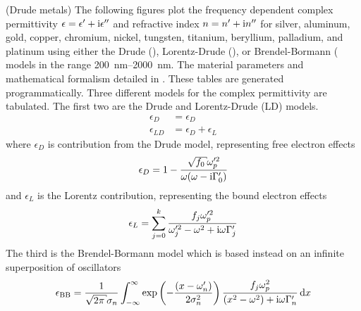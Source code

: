 
(Drude metals) The following figures plot the frequency dependent complex permittivity
$\epsilon = \epsilon' + {\mathrm{i}} \epsilon''$ and refractive index $n = n' + {\mathrm{i}}
n''$ for silver, aluminum, gold, copper, chromium, nickel, tungsten,
titanium, beryllium, palladium, and platinum using either the Drude
(),
Lorentz-Drude (), or Brendel-Bormann
(  models in the range
\SIrange{200}{2000}{\nano\meter}.  The material parameters and mathematical
formalism detailed in \cite{rakik1998}.  These tables are generated
programmatically.
Three different models for the complex permittivity are tabulated.  The
first two are the Drude and Lorentz-Drude (LD) models.
\begin{align}
\epsilon_{D}&=\epsilon_D\\
\epsilon_{LD}&=\epsilon_D+\epsilon_L
\end{align}
where $\epsilon_D$ is contribution from the Drude model, representing
free electron effects
\begin{align}
\epsilon_D=1-\frac{\sqrt{f_0} \omega_p^{\prime 2}}{\omega(\omega -
\mi\Gamma_0^\prime)}
\label{eqn:drude}
\end{align}
and $\epsilon_L$ is the Lorentz contribution, representing the bound
electron effects
\begin{align}
\epsilon_L =\sum_{j=0}^{k}\frac{f_j\omega_p^{\prime 2}}{\omega_j^{\prime
2}-\omega^2+{\mathrm{i}}\omega\Gamma_j^\prime}
\label{eqn:lorentzdrude}
\end{align}
The third is the Brendel-Bormann model which is based instead on an
infinite superposition of oscillators
\begin{align}
\epsilon_\text{BB} = \frac{1}{\sqrt{2 \pi} \sigma_n} \intinfty
\exp\left(-\frac{(x-\omega'_n)}{2 \sigma_n^2}\right)
\frac{f_j \omega_p^2}{(x^2-\omega^2)+\mi \omega \Gamma'_n} \md x
\label{eqn:brendelbormann}
\end{align}
